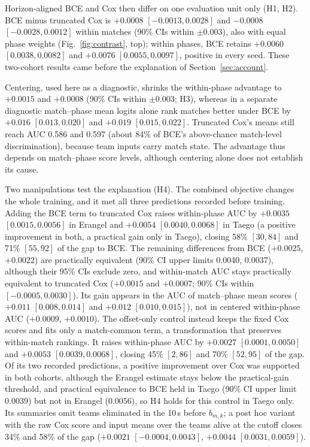 \documentclass[sigconf,anonymous,nonacm]{acmart}
\begin{document}
Horizon-aligned BCE and Cox then differ on one evaluation unit only (H1, H2). BCE minus truncated Cox is $+0.0008$ $[-0.0013,\allowbreak 0.0028]$ and $-0.0008$ $[-0.0028,\allowbreak 0.0012]$ within matches (90\% CIs within $\pm0.003$), also with equal phase weights (Fig.~\ref{fig:contrast}, top); within phases, BCE retains $+0.0060$ $[0.0038,\allowbreak 0.0082]$ and $+0.0076$ $[0.0055,\allowbreak 0.0097]$, positive in every seed. These two-cohort results came before the explanation of Section~\ref{sec:account}.

Centering, used here as a diagnostic, shrinks the within-phase advantage to $+0.0015$ and $+0.0008$ (90\% CIs within $\pm0.003$; H3), whereas in a separate diagnostic match--phase mean logits alone rank matches better under BCE by $+0.016$ $[0.013,\allowbreak 0.020]$ and $+0.019$ $[0.015,\allowbreak 0.022]$. Truncated Cox's means still reach AUC 0.586 and 0.597 (about 84\% of BCE's above-chance match-level discrimination), because team inputs carry match state. The advantage thus depends on match--phase score levels, although centering alone does not establish its cause.

Two manipulations test the explanation (H4). The combined objective changes the whole training, and it met all three predictions recorded before training. Adding the BCE term to truncated Cox raises within-phase AUC by $+0.0035$ $[0.0015,\allowbreak 0.0056]$ in Erangel and $+0.0054$ $[0.0040,\allowbreak 0.0068]$ in Taego (a positive improvement in both, a practical gain only in Taego), closing 58\% $[30,\allowbreak 84]$ and 71\% $[55,\allowbreak 92]$ of the gap to BCE. The remaining differences from BCE ($+0.0025$, $+0.0022$) are practically equivalent (90\% CI upper limits 0.0040, 0.0037), although their 95\% CIs exclude zero, and within-match AUC stays practically equivalent to truncated Cox ($+0.0015$ and $+0.0007$; 90\% CIs within $[-0.0005,\allowbreak 0.0030]$). Its gain appears in the AUC of match--phase mean scores ($+0.011$ $[0.008,\allowbreak 0.014]$ and $+0.012$ $[0.010,\allowbreak 0.015]$), not in centered within-phase AUC ($+0.0009$, $+0.0010$). The offset-only control instead keeps the fixed Cox scores and fits only a match-common term, a transformation that preserves within-match rankings. It raises within-phase AUC by $+0.0027$ $[0.0001,\allowbreak 0.0050]$ and $+0.0053$ $[0.0039,\allowbreak 0.0068]$, closing 45\% $[2,\allowbreak 86]$ and 70\% $[52,\allowbreak 95]$ of the gap. Of its two recorded predictions, a positive improvement over Cox was supported in both cohorts, although the Erangel estimate stays below the practical-gain threshold, and practical equivalence to BCE held in Taego (90\% CI upper limit 0.0039) but not in Erangel (0.0056), so H4 holds for this control in Taego only. Its summaries omit teams eliminated in the 10\,s before $b_{m,k}$; a post hoc variant with the raw Cox score and input means over the teams alive at the cutoff closes 34\% and 58\% of the gap ($+0.0021$ $[-0.0004,\allowbreak 0.0043]$, $+0.0044$ $[0.0031,\allowbreak 0.0059]$).
\end{document}
